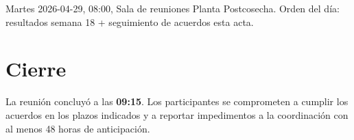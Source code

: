\documentclass{../base/canon}
\begin{document}
\begin{ObservationBox}
  Martes 2026-04-29, 08:00, Sala de reuniones Planta Postcosecha.
  Orden del día: resultados semana 18 + seguimiento de acuerdos esta acta.
\end{ObservationBox}

\section{Cierre}

La reunión concluyó a las \textbf{09:15}.  Los participantes se comprometen a
cumplir los acuerdos en los plazos indicados y a reportar impedimentos a la
coordinación con al menos 48 horas de anticipación.

\vspace{10pt}
\noindent
\begin{minipage}{0.45\linewidth}
\end{minipage}
\hfill
\begin{minipage}{0.45\linewidth}
\end{minipage}

\ContactSignature
\end{document}
